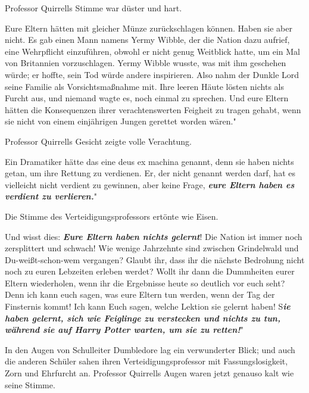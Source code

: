 Professor Quirrells Stimme war düster und hart.

\glqq Eure Eltern hätten mit gleicher Münze zurückschlagen können. Haben sie
aber nicht. Es gab einen Mann namens Yermy Wibble, der die Nation dazu aufrief,
eine Wehrpflicht einzuführen, obwohl er nicht genug Weitblick hatte, um ein Mal
von Britannien vorzuschlagen. Yermy Wibble wusste, was mit ihm geschehen würde;
er hoffte, sein Tod würde andere inspirieren. Also nahm der Dunkle Lord seine
Familie als Vorsichtsmaßnahme mit. Ihre leeren Häute lösten nichts als Furcht
aus, und niemand wagte es, noch einmal zu sprechen. Und eure Eltern hätten die
Konsequenzen ihrer verachtenswerten Feigheit zu tragen gehabt, wenn sie nicht
von einem einjährigen Jungen gerettet worden wären."

Professor Quirrells Gesicht zeigte volle Verachtung.

\glqq Ein Dramatiker hätte das eine deus ex machina genannt, denn sie haben
nichts getan, um ihre Rettung zu verdienen. Er, der nicht genannt werden darf,
hat es vielleicht nicht verdient zu gewinnen, aber keine Frage,
\textbf{\emph{eure Eltern haben es verdient zu verlieren.}}"

Die Stimme des Verteidigungsprofessors ertönte wie Eisen.

\glqq Und wisst dies: \textbf{\emph{Eure Eltern haben nichts gelernt}}! Die
Nation ist immer noch zersplittert und schwach! Wie wenige Jahrzehnte sind
zwischen Grindelwald und Du-weißt-schon-wem vergangen? Glaubt ihr, dass ihr die
nächste Bedrohung nicht noch zu euren Lebzeiten erleben werdet? Wollt ihr dann
die Dummheiten eurer Eltern wiederholen, wenn ihr die Ergebnisse heute so
deutlich vor euch seht? Denn ich kann euch sagen, was eure Eltern tun werden,
wenn der Tag der Finsternis kommt! Ich kann Euch sagen, welche Lektion sie
gelernt haben! S\textbf{\emph{ie haben gelernt, sich wie Feiglinge zu verstecken
und nichts zu tun, während sie auf Harry Potter warten, um sie zu retten!}}"

In den Augen von Schulleiter Dumbledore lag ein verwunderter Blick; und auch die
anderen Schüler sahen ihren Verteidigungsprofessor mit Fassungslosigkeit, Zorn
und Ehrfurcht an. Professor Quirrells Augen waren jetzt genauso kalt wie seine
Stimme.

